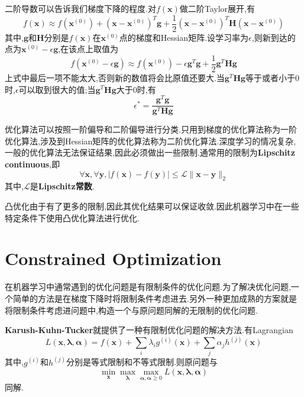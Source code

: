 二阶导数可以告诉我们梯度下降的程度.对$f(\mathbf x)$做二阶Taylor展开,有
\begin{equation}
f(\mathbf x)\approx f(\mathbf x^{(0)})+(\mathbf x-\mathbf x^{(0)})^T\mathbf g+\frac{1}{2}(\mathbf x-\mathbf x^{(0)})^T\mathbf H(\mathbf x-\mathbf x^{(0)})
\end{equation}
其中,$\mathbf g$和$\mathbf H$分别是$f(\mathbf x)$在$\mathbf x^{(0)}$点的梯度和Hessian矩阵.设学习率为$\epsilon$,则新到达的点为$\mathbf x^{(0)}-\epsilon\mathbf g$,在该点上取值为
\begin{equation}
f(\mathbf x^{(0)}-\epsilon\mathbf g)\approx f(\mathbf x^{(0)})-\epsilon\mathbf g^T\mathbf g+\frac{1}{2}\mathbf g^T\mathbf{Hg}
\end{equation}
上式中最后一项不能太大,否则新的数值将会比原值还要大.当$\mathbf g^T\mathbf{Hg}$等于或者小于$0$时,$\epsilon$可以取到很大的值;当$\mathbf g^T\mathbf{Hg}$大于$0$时,有
\begin{equation}
\epsilon^\ast=\frac{\mathbf g^T\mathbf g}{\mathbf g^T\mathbf{Hg}}
\end{equation}

优化算法可以按照一阶偏导和二阶偏导进行分类.只用到梯度的优化算法称为一阶优化算法,涉及到Hessian矩阵的优化算法称为二阶优化算法.深度学习的情况复杂,一般的优化算法无法保证结果,因此必须做出一些限制.通常用的限制为\textbf{Lipschitz continuous},即
\begin{equation}
\forall\mathbf x,\forall\mathbf y,|f(\mathbf x)-f(\mathbf y)|\le\mathcal L\|\mathbf{x-y}\|_2
\end{equation}
其中,$\mathcal L$是\textbf{Lipschitz常数}.

凸优化由于有了更多的限制,因此其优化结果可以保证收敛.因此机器学习中在一些特定条件下使用凸优化算法进行优化.

\section{Constrained Optimization}
在机器学习中通常遇到的优化问题是有限制条件的优化问题.为了解决优化问题,一个简单的方法是在梯度下降时将限制条件考虑进去.另外一种更加成熟的方案就是将限制条件考虑进问题中,构造一个与原问题同解的无限制的优化问题.

\textbf{Karush-Kuhn-Tucker}就提供了一种有限制优化问题的解决方法.有Lagrangian
\begin{equation}
L(\mathbf{x,\lambda,\alpha})=f(\mathbf x)+\sum_i\lambda_ig^{(i)}(\mathbf x)+\sum_j\alpha_jh^{(j)}(\mathbf x)
\end{equation}
其中,$g^{(i)}$和$h^{(j)}$分别是等式限制和不等式限制.则原问题与
\begin{equation}
\min_{\mathbf x}\max_{\mathbf\lambda}\max_{\mathbf{\alpha,\alpha}\ge 0}L(\mathbf{x,\lambda,\alpha})
\end{equation}
同解.